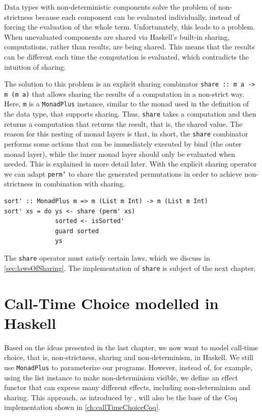 \documentclass[a4paper, 11pt, fleqn, twoside]{scrreprt}
\newcommand{\todo}[1]{\marginpar{\textbf{TODO:} #1}}
\newcommand{\hinl}[1]{\texttt{#1}}
\begin{document}
Data types with non-deterministic components solve the problem of non-strictness because each component can be evaluated individually, instead of forcing the evaluation of the whole term.
Unfortunately, this leads to a problem.
\label{sec:sharingComputations}
When unevaluated components are shared via Haskell's built-in sharing, computations, rather than results, are being shared.
This means that the results can be different each time the computation is evaluated, which contradicts the intuition of sharing.

The solution to this problem is an explicit sharing combinator \hinl{share :: m a -> m (m a)} that allows sharing the results of a computation in a non-strict way.
Here, \hinl{m} is a \hinl{MonadPlus} instance, similar to the monad used in the definition of the data type, that supports sharing.
Thus, \hinl{share} takes a  computation and then returns a computation that returns the result, that is, the shared value.
The reason for this nesting of monad layers is that, in short, the \hinl{share} combinator performs some actions that can be immediately executed by bind (the outer monad layer), while the inner monad layer should only be evaluated when needed.
This is explained in more detail later.
With the explicit sharing operator we can adapt \hinl{perm'} to share the generated permutations in order to achieve non-strictness in combination with sharing.

\begin{verbatim}
sort' :: MonadPlus m => m (List m Int) -> m (List m Int)
sort' xs = do ys <- share (perm' xs)
              sorted <- isSorted'
              guard sorted
              ys
\end{verbatim}

The \hinl{share} operator must satisfy certain laws, which we discuss in \autoref{sec:lawsOfSharing}.
The implementation of \hinl{share} is subject of the next chapter.

\chapter{Call-Time Choice modelled in Haskell}
Based on the ideas presented in the last chapter, we now want to model call-time choice, that is, non-strictness, sharing and non-determinism, in Haskell.
We still use \hinl{MonadPlus} to parameterize our programs.
However, instead of, for example, using the list instance to make non-determinism visible, we define an effect functor that can express many different effects, including non-determinism and sharing.
This approach, as introduced by \citet{wu2014effect}, will also be the base of the Coq implementation shown in \autoref{ch:callTimeChoiceCoq}.
\todo{Definition effect}
\end{document}
